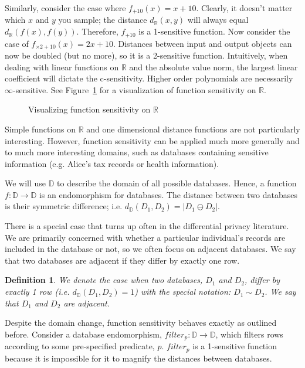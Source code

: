 \documentclass[12pt]{report}
\newtheorem{defn}{Definition}[section]
\begin{document}
Similarly, consider the case where $f_{+10}(x) = x + 10$.
Clearly, it doesn't matter which $x$ and $y$ you sample; the distance $d_{\mathbb R}(x,y)$ will always equal $d_{\mathbb R}(f(x),f(y))$.
Therefore, $f_{+10}$ is a 1-sensitive function.
Now consider the case of $f_{\times 2+10}(x) = 2x + 10$.
Distances between input and output objects can now be doubled (but no more), so it is a 2-sensitive function.
Intuitively, when dealing with linear functions on $\mathbb R$ and the absolute value norm, the largest linear coefficient will dictate the c-sensitivity.
Higher order polynomials are necessarily $\infty$-sensitive.
See Figure~\ref{fig:fn_sens} for a visualization of function sensitivity on $\mathbb R$.

\begin{figure}
    \centering
    \def\svgwidth{\columnwidth}
    
    \caption{Visualizing function sensitivity on $\mathbb{R}$}
    \label{fig:fn_sens}
\end{figure}

Simple functions on $\mathbb R$ and one dimensional distance functions are not particularly interesting.
However, function sensitivity can be applied much more generally and to much more interesting domains, such as databases containing sensitive information (e.g. Alice's tax records or health information).

We will use $\mathbb D$ to describe the domain of all possible databases.
Hence, a function $f : \mathbb D \rightarrow \mathbb D$ is an endomorphism for databases.
The distance between two databases is their symmetric difference; i.e. $d_{\mathbb D}(D_1,D_2) = | D_1 \ominus D_2 |$.

There is a special case that turns up often in the differential privacy literature.
We are primarily concerned with whether a particular individual's records are included in the database or not, so we often focus on adjacent databases.
We say that two databases are adjacent if they differ by exactly one row.

\begin{defn}
  We denote the case when two databases, $D_1$ and $D_2$, differ by exactly 1 row (i.e. $d_{\mathbb D}(D_1,D_2)=1$) with the special notation: $D_1 \sim D_2$.
  We say that $D_1$ and $D_2$ are adjacent.
\end{defn}

Despite the domain change, function sensitivity behaves exactly as outlined before.
Consider a database endomorphism, $filter_p : \mathbb D \rightarrow \mathbb D$, which filters rows according to some pre-specified predicate, $p$.
$filter_p$ is a 1-sensitive function because it is impossible for it to magnify the distances between databases.
\end{document}
